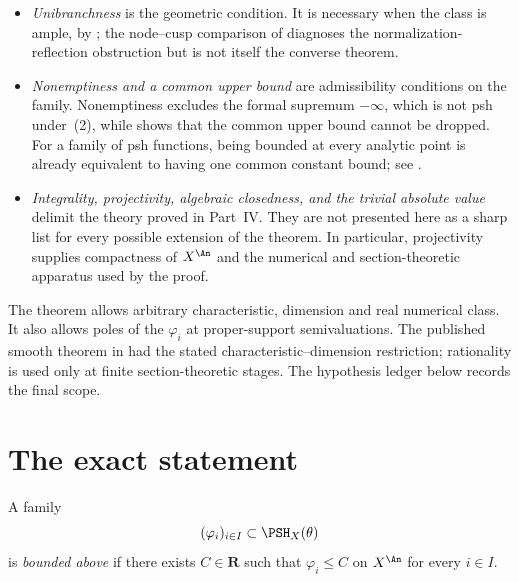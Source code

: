\begin{itemize}
\item \emph{Unibranchness} is the geometric condition.  It is necessary
      when the class is ample, by ; the
      node--cusp comparison of  diagnoses the
      normalization-reflection obstruction but is not itself the converse
      theorem.
\item \emph{Nonemptiness and a common upper bound} are admissibility
      conditions on the family.  Nonemptiness excludes the formal supremum
      $-\infty$, which is not psh under \,(2), while
       shows that the common upper bound
      cannot be dropped.  For a family of psh functions, being bounded at
      every analytic point is already equivalent to having one common
      constant bound; see .
\item \emph{Integrality, projectivity, algebraic closedness, and the trivial
      absolute value} delimit the theory proved in Part~IV.  They are not
      presented here as a sharp list for every possible extension of the
      theorem.  In particular, projectivity supplies compactness of
      $X^{\An}$ and the numerical and section-theoretic apparatus used by
      the proof.
\end{itemize}

The theorem allows arbitrary characteristic, dimension and real numerical
class. It also allows poles of the $\varphi_i$ at proper-support
semivaluations. The published smooth theorem in 
had the stated characteristic--dimension restriction; rationality is used
only at finite section-theoretic stages. The hypothesis ledger below records
the final scope.

\section{The exact statement}

\begin{definition}
\label{def:bj-bounded-family}
A family
\[
              (\varphi_i)_{i\in I}\subset\PSH_X(\theta)
\]
is \emph{bounded above} if there exists $C\in\mathbf R$ such that
$\varphi_i\le C$ on $X^{\An}$ for every $i\in I$.
\end{definition}

